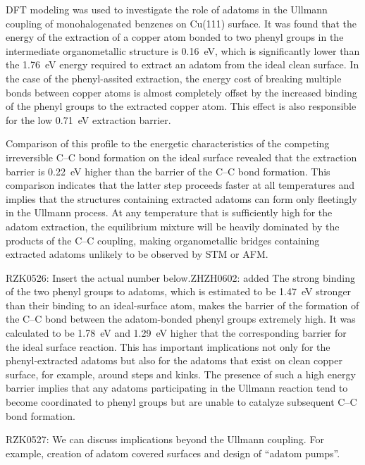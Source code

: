 \documentclass[%
 reprint,
 amsmath,amssymb,
 aps,
prb,
floatfix,
]{revtex4-2}
\newcommand{\lock}{\color{red}}
\newcommand{\zhzh}{\color{blue}}
\newcommand{\lock}{\color{red}}
\newcommand{\zhzh}{\color{blue}}
\newcommand{\comm}{\color{Purple}} %
\begin{document}
{\lock

DFT modeling was used to investigate the role of adatoms in the Ullmann coupling of monohalogenated benzenes on Cu(111) surface. It was found that the energy of the extraction of a copper atom bonded to two phenyl groups in the intermediate organometallic structure is \SI{0.16}{\electronvolt}, which is significantly lower than the \SI{1.76}{\electronvolt} energy required to extract an adatom from the ideal clean surface. In the case of the phenyl-assited extraction, the energy cost of breaking multiple bonds between copper atoms is almost completely offset by the increased binding of the phenyl groups to the extracted copper atom. This effect is also responsible for the low \SI{0.71}{\electronvolt} extraction barrier. 

Comparison of this profile to the energetic characteristics of the competing irreversible C--C bond formation on the ideal surface revealed that the extraction barrier is \SI{0.22}{\electronvolt} higher than the barrier of the C--C bond formation. This comparison indicates that the latter step proceeds faster at all temperatures and implies that the structures containing extracted adatoms can form only fleetingly in the Ullmann process. At any temperature that is sufficiently high for the adatom extraction, the equilibrium mixture will be heavily dominated by the products of the C--C coupling, making organometallic bridges containing extracted adatoms unlikely to be observed by STM or AFM.


{\comm RZK0526: Insert the actual number below.}{\zhzh ZHZH0602: added}
The strong binding of the two phenyl groups to adatoms, which is estimated to be \SI{1.47}{\electronvolt} stronger than their binding to an ideal-surface atom, makes the barrier of the formation of the C--C bond between the adatom-bonded phenyl groups extremely high. It was calculated to be \SI{1.78}{\electronvolt} and \SI{1.29}{\electronvolt} higher that the corresponding barrier for the ideal surface reaction. This has important implications not only for the phenyl-extracted adatoms but also for the adatoms that exist on clean copper surface, for example, around steps and kinks. The presence of such a high energy barrier implies that any adatoms participating in the Ullmann reaction tend to become coordinated to phenyl groups but are unable to catalyze subsequent C--C bond formation.

{\comm RZK0527: We can discuss implications beyond the Ullmann coupling. For example, creation of adatom covered surfaces and design of ``adatom pumps''.}

}
\end{document}
